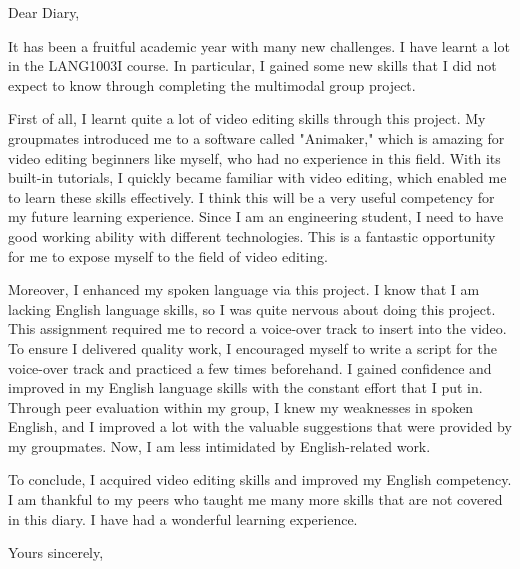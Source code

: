 \documentclass{letter}
\begin{document}
\begin{letter}{}
\opening{Dear Diary,}


It has been a fruitful academic year with many new challenges. I have learnt a lot in the LANG1003I course. In particular, I gained some new skills that I did not expect to know through completing the multimodal group project.

 
First of all, I learnt quite a lot of video editing skills through this project. My groupmates introduced me to a software called "Animaker," which is amazing for video editing beginners like myself, who had no experience in this field. With its built-in tutorials, I quickly became familiar with video editing, which enabled me to learn these skills effectively. I think this will be a very useful competency for my future learning experience. Since I am an engineering student, I need to have good working ability with different technologies. This is a fantastic opportunity for me to expose myself to the field of video editing.
 
Moreover, I enhanced my spoken language via this project. I know that I am lacking English language skills, so I was quite nervous about doing this project. This assignment required me to record a voice-over track to insert into the video. To ensure I delivered quality work, I encouraged myself to write a script for the voice-over track and practiced a few times beforehand. I gained confidence and improved in my English language skills with the constant effort that I put in. Through peer evaluation within my group, I knew my weaknesses in spoken English, and I improved a lot with the valuable suggestions that were provided by my groupmates. Now, I am less intimidated by English-related work.
 
To conclude, I acquired video editing skills and improved my English competency. I am thankful to my peers who taught me many more skills that are not covered in this diary. I have had a wonderful learning experience.
 

\closing{Yours sincerely,}



\end{letter}
\end{document}
